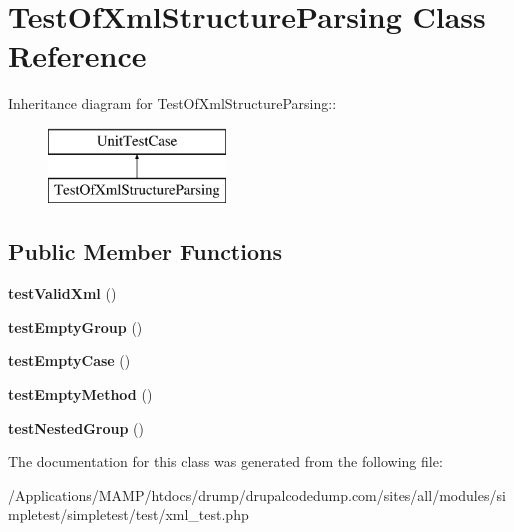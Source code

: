 \hypertarget{class_test_of_xml_structure_parsing}{
\section{TestOfXmlStructureParsing Class Reference}
\label{class_test_of_xml_structure_parsing}
}
Inheritance diagram for TestOfXmlStructureParsing::\begin{figure}[H]
\begin{center}
\leavevmode
\includegraphics[height=2cm]{class_test_of_xml_structure_parsing}
\end{center}
\end{figure}
\subsection*{Public Member Functions}
\begin{DoxyCompactItemize}
\item 
\hypertarget{class_test_of_xml_structure_parsing_a75493f9218f26ffa4d28891a38c2496f}{
{\bfseries testValidXml} ()}
\label{class_test_of_xml_structure_parsing_a75493f9218f26ffa4d28891a38c2496f}

\item 
\hypertarget{class_test_of_xml_structure_parsing_ab83981ce421f01b4770449122b2c91dd}{
{\bfseries testEmptyGroup} ()}
\label{class_test_of_xml_structure_parsing_ab83981ce421f01b4770449122b2c91dd}

\item 
\hypertarget{class_test_of_xml_structure_parsing_afed0c871205ebf973af51ae646dccd65}{
{\bfseries testEmptyCase} ()}
\label{class_test_of_xml_structure_parsing_afed0c871205ebf973af51ae646dccd65}

\item 
\hypertarget{class_test_of_xml_structure_parsing_a6bfbb3ef033b6d61d2b1209884f238ec}{
{\bfseries testEmptyMethod} ()}
\label{class_test_of_xml_structure_parsing_a6bfbb3ef033b6d61d2b1209884f238ec}

\item 
\hypertarget{class_test_of_xml_structure_parsing_ad72ce5aecb1f9560d771b2fdff2f547c}{
{\bfseries testNestedGroup} ()}
\label{class_test_of_xml_structure_parsing_ad72ce5aecb1f9560d771b2fdff2f547c}

\end{DoxyCompactItemize}


The documentation for this class was generated from the following file:\begin{DoxyCompactItemize}
\item 
/Applications/MAMP/htdocs/drump/drupalcodedump.com/sites/all/modules/simpletest/simpletest/test/xml\_\-test.php\end{DoxyCompactItemize}
